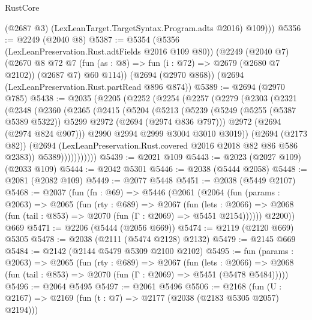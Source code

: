\begin{lexlean}{RustCore}
\begin{coremodule}
          (@2687 @3)
          (LexLeanTarget.TargetSyntax.Program.adts @2016)
          @109)))
@5356 := @2249 (@2040 @8)
@5387 := @5354
    (@5356 (LexLeanPreservation.Rust.adtFields @2016 @109 @80))
    (@2249
      (@2040 @7)
      (@2670
        @8
        @72
        @7
        (fun (as : @8) => fun (i : @72) => @2679 (@2680 @7 @2102))
        (@2687 @7)
        @60
        @114))
    (@2694 (@2970 @868))
    (@2694 (LexLeanPreservation.Rust.partRead @896 @874))
@5389 := @2694 (@2970 @785)
@5438 := @2035
    (@2205
      (@2252
        (@2254
          (@2257
            (@2279
              (@2303
                (@2321
                  (@2348
                    (@2360
                      (@2365
                        (@2415
                          (@5204
                            (@5213
                              (@5239
                                (@5249
                                  (@5255 (@5387 @5389 @5322))
                                  @5299
                                  @2972
                                  (@2694 (@2974 @836 @797)))
                                @2972
                                (@2694 (@2974 @824 @907)))
                              @2990
                              @2994
                              @2999
                              @3004
                              @3010
                              @3019))
                          (@2694 (@2173 @82))
                          (@2694 (LexLeanPreservation.Rust.covered @2016 @2018 @82 @86 @586 @2383))
                          @5389)))))))))))
@5439 := @2021 @109
@5443 := @2023 (@2027 @109) (@2033 @109)
@5444 := @2042 @5301
@5446 := @2038 (@5444 @2058)
@5448 := @2081 (@2082 @109)
@5449 := @2077 @5448
@5451 := @2038 (@5449 @2107)
@5468 := @2037
    (fun (fn : @69) =>
    @5446
      (@2061
        (@2064
          (fun (params : @2063) =>
          @2065
            (fun (rty : @689) =>
            @2067
              (fun (lets : @2066) =>
              @2068 (fun (tail : @853) => @2070 (fun (Γ : @2069) => @5451 @2154))))))
        @2200))
    @669
@5471 := @2206 (@5444 (@2056 @669))
@5474 := @2119 (@2120 @669) @5305
@5478 := @2038 (@2111 (@5474 @2128) @2132)
@5479 := @2145 @669
@5484 := @2142 (@2144 @5479 @5309 @2100 @2102)
@5495 := fun (params : @2063) =>
  @2065
    (fun (rty : @689) =>
    @2067
      (fun (lets : @2066) =>
      @2068 (fun (tail : @853) => @2070 (fun (Γ : @2069) => @5451 (@5478 @5484)))))
@5496 := @2064 @5495
@5497 := @2061 @5496
@5506 := @2168 (fun (U : @2167) => @2169 (fun (t : @7) => @2177 (@2038 (@2183 @5305 @2057) @2194)))

\end{coremodule}
\end{lexlean}
